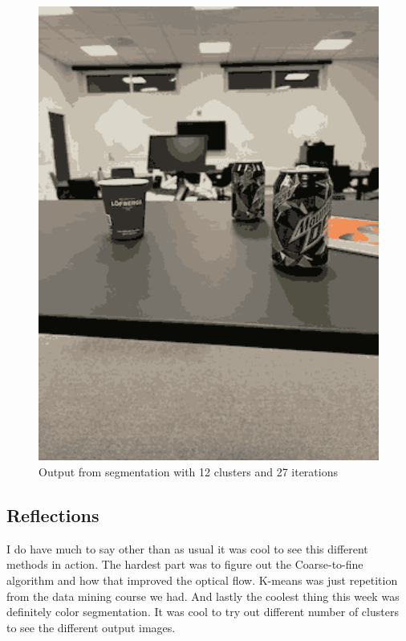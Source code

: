 \documentclass{article}
\begin{document}
\begin{figure}[H]
    \centering
    \includegraphics[width=1\textwidth]{segmented.png} 
    \caption{Output from segmentation with 12 clusters and 27 iterations}
    \label{fig:segOut}
\end{figure}

\subsection{Reflections}
I do have much to say other than as usual it was cool to see this different methods in action. The hardest part was to figure out the Coarse-to-fine algorithm and how that improved the optical flow. K-means was just repetition from the data mining course we had. And lastly the coolest thing this week was definitely color segmentation. It was cool to try out different number of clusters to see the different output images.
\end{document}
